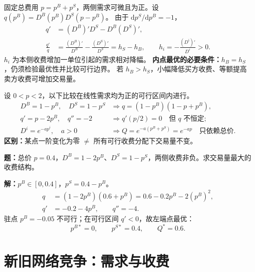 \begin{proofbox}[title=推导]
固定总费用 $p=p^B+p^S$，两侧需求可微且为正。设 $q(p^B)=D^B(p^B)D^S(p-p^B)$。
由于 $\mathrm dp^S/\mathrm dp^B=-1$，
\begin{align*}
q'&=(D^B)'D^S-D^B(D^S)',\\
\frac{q'}q&=\frac{(D^B)'}{D^B}-\frac{(D^S)'}{D^S}
=h_S-h_B,\qquad h_i=-\frac{(D^i)'}{D^i}>0.
\end{align*}
$h_i$ 为本侧收费增加一单位引起的需求相对降幅。
\textbf{内点最优的必要条件：}$h_B=h_S$，仍须检验最优性并比较可行边界。
若 $h_B>h_S$，小幅降低买方收费、等额提高卖方收费可增加交易量。
\end{proofbox}
\begin{proofbox}[title=局部平稳与全局中性]
设 $0<p<2$，以下比较在线性需求均为正的可行区间内进行。
\begin{align*}
D^B=1-p^B,\quad D^S=1-p^S
&\Rightarrow q=(1-p^B)(1-p+p^B),\\
q'=p-2p^B,\quad q''=-2
&\Rightarrow q'(p/2)=0\quad\text{但 }q\text{ 不恒定};\\
D^i=e^{-ap^i},\quad a>0
&\Rightarrow Q=e^{-a(p^B+p^S)}=e^{-ap}\quad\text{只依赖总价}.
\end{align*}
\textbf{区别：}某点一阶变化为零 $\neq$ 所有可行收费分配下交易量不变。
\end{proofbox}

\begin{examplebox}[title={\PriorityMust\quad 例题：非负收费约束}]
\textbf{题：}总价 $p=0.4$，$D^B=1-2p^B$、$D^S=1-p^S$，两侧收费非负。求交易量最大的收费结构。

\textbf{解：}$p^B\in[0,0.4]$，$p^S=0.4-p^B$。
\begin{align*}
q&=(1-2p^B)(0.6+p^B)=0.6-0.2p^B-2(p^B)^2,\\
q'&=-0.2-4p^B,\qquad q''=-4.
\end{align*}
驻点 $p^B=-0.05$ 不可行；在可行区间 $q'<0$，故左端点最优：
\[
\boxed{p^{B*}=0,\qquad p^{S*}=0.4,\qquad Q^*=0.6.}
\]
\end{examplebox}

\section{新旧网络竞争：需求与收费}

\label{kp:fee}

